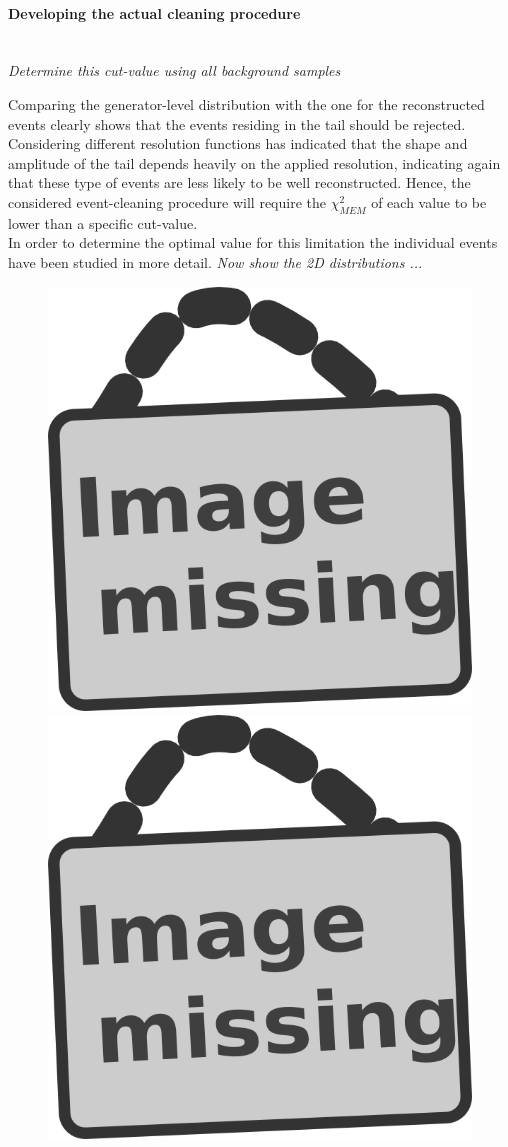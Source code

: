 \paragraph{Developing the actual cleaning procedure} \hfill \\

\textit{Determine this cut-value using all background samples}

Comparing the generator-level distribution with the one for the reconstructed events clearly shows that the events residing in the tail should be rejected. Considering different resolution functions has indicated that the shape and amplitude of the tail depends heavily on the applied resolution, indicating again that these type of events are less likely to be well reconstructed.
Hence, the considered event-cleaning procedure will require the $\chi^{2}_{MEM}$ of each value to be lower than a specific cut-value. 
\\
In order to determine the optimal value for this limitation the individual events have been studied in more detail.
\textit{Now show the 2D distributions ...}
\begin{figure}[h!t]
 \centering
 \includegraphics[width = 0.35 \textwidth]{image.png}
 \includegraphics[width = 0.35 \textwidth]{image.png}
 \caption{} \label{fig::SMLik2D}
\end{figure}

